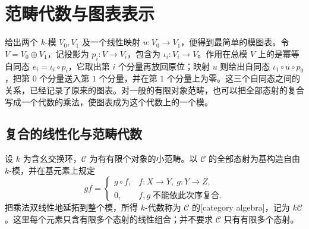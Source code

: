 
\section{范畴代数与图表表示}
\label{b4:sec:0105}

给出两个 \(k\)-模 \(V_0,V_1\) 及一个线性映射 \(u:V_0\to V_1\)，便得到最简单的模图表。令 \(V=V_0\oplus V_1\)，记投影为 \(p_i:V\rightarrow V_i\)，包含为 \(\iota_i:V_i\rightarrow V\)。作用在总模 \(V\) 上的是幂等自同态 \(e_i=\iota_i\circ p_i\)，它取出第 \(i\) 个分量再放回原位；映射 \(u\) 则给出自同态 \(\iota_1\circ u\circ p_0\)，把第 \(0\) 个分量送入第 \(1\) 个分量，并在第 \(1\) 个分量上为零。这三个自同态之间的关系，已经记录了原来的图表。对一般的有限对象范畴，也可以把全部态射的复合写成一个代数的乘法，使图表成为这个代数上的一个模。

\subsection{复合的线性化与范畴代数}
\label{b4:subsec:0105:01}

\begin{definition}\label{b4:def:category-algebra}
	设 \(k\) 为含幺交换环，\(\mathcal C\) 为有有限个对象的小范畴。以 \(\mathcal C\) 的全部态射为基构造自由 \(k\)-模，并在基元素上规定
	\[
		gf=\begin{cases}
			g\circ f,&f:X\to Y,\ g:Y\to Z,\\
			0,&f,g\;\text{不能依此次序复合}.
		\end{cases}
	\]
	把乘法双线性地延拓到整个模，所得 \(k\)-代数称为 \(\mathcal C\) 的[category algebra]，记为 \(k\mathcal C\)。这里每个元素只含有限多个态射的线性组合；并不要求 \(\mathcal C\) 只有有限多个态射。
\end{definition}

